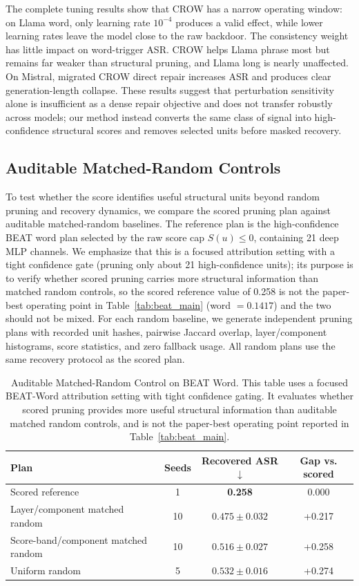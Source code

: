 \documentclass[lettersize,journal]{IEEEtran}
\begin{document}
The complete tuning results show that CROW has a narrow operating window: on Llama word, only learning rate $10^{-4}$ produces a valid effect, while lower learning rates leave the model close to the raw backdoor. The consistency weight has little impact on word-trigger ASR. CROW helps Llama phrase most but remains far weaker than structural pruning, and Llama long is nearly unaffected. On Mistral, migrated CROW direct repair increases ASR and produces clear generation-length collapse. These results suggest that perturbation sensitivity alone is insufficient as a dense repair objective and does not transfer robustly across models; our method instead converts the same class of signal into high-confidence structural scores and removes selected units before masked recovery.

\subsection{Auditable Matched-Random Controls}
To test whether the score identifies useful structural units beyond random pruning and recovery dynamics, we compare the scored pruning plan against auditable matched-random baselines. The reference plan is the high-confidence BEAT word plan selected by the raw score cap $S(u)\le 0$, containing 21 deep MLP channels. We emphasize that this is a focused attribution setting with a tight confidence gate (pruning only about 21 high-confidence units); its purpose is to verify whether scored pruning carries more structural information than matched random controls, so the scored reference value of 0.258 is not the paper-best operating point in Table~\ref{tab:beat_main} (word $=0.1417$) and the two should not be mixed. For each random baseline, we generate independent pruning plans with recorded unit hashes, pairwise Jaccard overlap, layer/component histograms, score statistics, and zero fallback usage. All random plans use the same recovery protocol as the scored plan.

\begin{table}[!t]
\caption{Auditable Matched-Random Control on BEAT Word. This table uses a focused BEAT-Word attribution setting with tight confidence gating. It evaluates whether scored pruning provides more useful structural information than auditable matched random controls, and is not the paper-best operating point reported in Table~\ref{tab:beat_main}.}
\label{tab:matched_random}
\centering
\begin{tabular}{lccc}
\toprule
Plan & Seeds & Recovered ASR$\downarrow$ & Gap vs. scored \\
\midrule
Scored reference & 1 & \textbf{0.258} & 0.000 \\
Layer/component matched random & 10 & $0.475\pm0.032$ & +0.217 \\
Score-band/component matched random & 10 & $0.516\pm0.027$ & +0.258 \\
Uniform random & 5 & $0.532\pm0.016$ & +0.274 \\
\bottomrule
\end{tabular}
\end{table}
\end{document}
